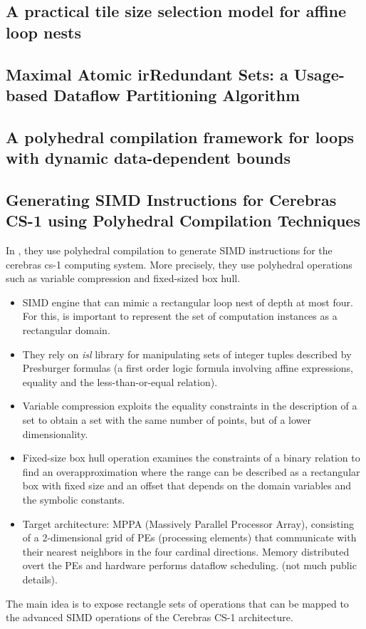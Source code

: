 \documentclass[a4paper, 11pt]{article}
\begin{document}
\subsection{A practical tile size selection model for affine loop nests}

\subsection{Maximal Atomic irRedundant Sets: a Usage-based Dataflow Partitioning Algorithm}

\subsection{A polyhedral compilation framework for loops with dynamic data-dependent bounds}

\subsection{Generating SIMD Instructions for Cerebras CS-1 using Polyhedral Compilation Techniques}
In \cite{verdoolaege2020generating}, they use polyhedral compilation to generate SIMD instructions for the cerebras cs-1 computing system. More precisely, they use polyhedral operations such as variable compression and fixed-sized box hull.
\begin{itemize}
    \item SIMD engine that can mimic a rectangular loop nest of depth at most four. For this, is important to represent the set of computation instances as a rectangular domain.
    \item They rely on \textit{isl} library for manipulating sets of integer tuples described by Presburger formulas (a first order logic formula involving affine expressions, equality and the less-than-or-equal relation). 
    \item Variable compression exploits the equality constraints in the description of a set to obtain a set with the same number of points, but of a lower dimensionality.
    \item Fixed-size box hull operation examines the constraints of a binary relation to find an overapproximation where the range can be described as a rectangular box with fixed size and an offset that depends on the domain variables and the symbolic constants.
    \item Target architecture: MPPA (Massively Parallel Processor Array), consisting of a 2-dimensional grid of PEs (processing elements) that communicate with their nearest neighbors in the four cardinal directions. Memory distributed overt the PEs and hardware performs dataflow scheduling. (not much public details).
\end{itemize}
The main idea is to expose rectangle sets of operations that can be mapped to the advanced SIMD operations of the Cerebras CS-1 architecture.
\end{document}
